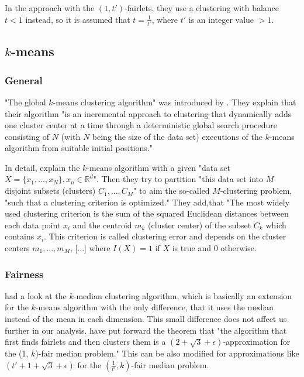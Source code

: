 In the approach with the $(1,t')$-fairlets, they use a clustering with balance $t < 1$ instead, so it is assumed that $t = \frac{1}{t'}$, where $t'$ is an integer value $> 1$. \autocite[6]{Chierichetti2018}


\subsection{$k$-means}
\label{k-means}

\subsubsection{General}

"The global $k$-means clustering algorithm" was introduced by \textcite[]{Likas2003}. They explain that their algorithm "is an incremental approach to clustering that dynamically adds one cluster center at a time through a deterministic global search procedure consisting of $N$ (with $N$ being the size of the data set) executions of the $k$-means algorithm from suitable initial positions." \autocite[1]{Likas2003}

In detail, \textcite[2]{Likas2003} explain the $k$-means algorithm with a given "data set $X = \{x_{1},...,x_{N}\},x_{n} \in \mathbb{R}^d$". Then they try to partition "this data set into $M$ disjoint subsets (clusters) $C_{1},...,C_{M}$" to aim the so-called $M$-clustering problem, "such that a clustering criterion is optimized." They add,that "The most widely used clustering criterion is the sum of the squared Euclidean distances between each data point $x_{i}$ and the centroid $m_{k}$ (cluster center) of the subset $C_{k}$ which contains $x_{i}$. This criterion is called clustering error and depends on the cluster centers $m_{1},...,m_{M}$, [...] where $I(X) = 1$ if $X$ is true and $0$ otherwise.

\subsubsection{Fairness}

\textcite[]{Chierichetti2018} had a look at the $k$-median clustering algorithm, which is basically an extension for the $k$-means algorithm with the only difference, that it uses the median instead of the mean in each dimension. \autocite[]{Jain1988} This small difference does not affect us further in our analysis. \textcite[]{Chierichetti2018} have put forward the theorem that "the algorithm that first finds fairlets and then clusters them is a $(2 + \sqrt{3} + \epsilon)$-approximation for the (1, $k$)-fair median problem." This can be also modified for approximations like $(t' + 1 + \sqrt{3} + \epsilon)$ for the $(\frac{1}{t'}, k)$-fair median problem. \autocite[9]{Chierichetti2018}

